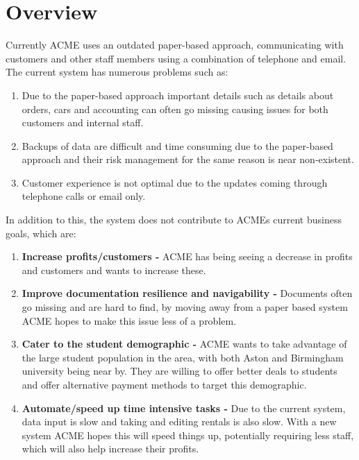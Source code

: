 \section{Overview}

  Currently ACME uses an outdated paper-based approach, communicating with customers and other staff members using a combination of telephone and email.
  The current system has numerous problems such as: 
  \begin{enumerate}
    \item Due to the paper-based approach important details such as details about orders, cars and accounting can often go missing causing issues 
    for both customers and internal staff.
    \item Backups of data are difficult and time consuming due to the paper-based approach and their risk management for the same reason is near non-existent.
    \item Customer experience is not optimal due to the updates coming through telephone calls or email only.
  \end{enumerate}

  In addition to this, the system does not contribute to ACMEs current business goals, which are:
  \begin{enumerate}
    \item \textbf{Increase profits/customers -} ACME has being seeing a decrease in profits and customers and wants to increase these.
    \item \textbf{Improve documentation resilience and navigability -} Documents often go missing and are hard to find, by moving away from a paper based
    system ACME hopes to make this issue less of a problem.
    \item \textbf{Cater to the student demographic -} ACME wants to take advantage of the large student population in the area, with both Aston and Birmingham
    university being near by. They are willing to offer better deals to students and offer alternative payment methods to target this demographic.
    \item \textbf{Automate/speed up time intensive tasks -} Due to the current system, data input is slow and taking and editing rentals is also slow. With a 
    new system ACME hopes this will speed things up, potentially requiring less staff, which will also help increase their profits.
  \end{enumerate}

